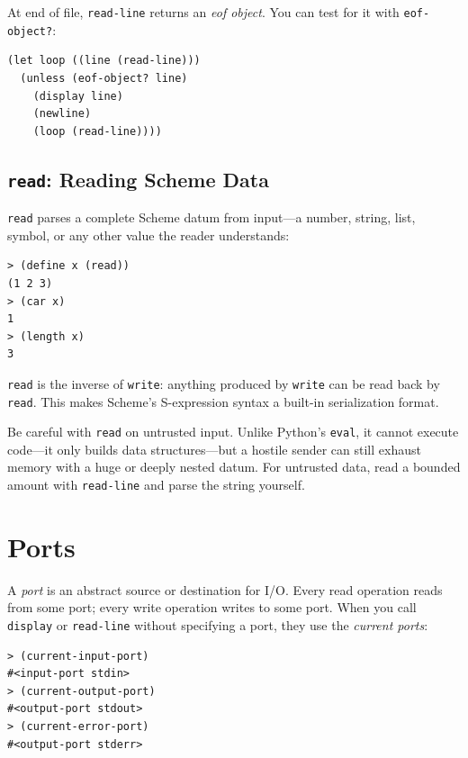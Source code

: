 At end of file, \texttt{read-line} returns an \emph{eof object}. You can test for it with \texttt{eof-object?}:

\begin{lstlisting}
(let loop ((line (read-line)))
  (unless (eof-object? line)
    (display line)
    (newline)
    (loop (read-line))))
\end{lstlisting}

\subsection{\texttt{read}: Reading Scheme Data}

\texttt{read} parses a complete Scheme datum from input---a number, string, list, symbol, or any other value the reader understands:

\begin{lstlisting}[style=repl]
> (define x (read))
(1 2 3)
> (car x)
1
> (length x)
3
\end{lstlisting}

\texttt{read} is the inverse of \texttt{write}: anything produced by \texttt{write} can be read back by \texttt{read}. This makes Scheme's S-expression syntax a built-in serialization format.

\begin{warning}[Security]
Be careful with \texttt{read} on untrusted input. Unlike Python's \texttt{eval}, it cannot execute code---it only builds data structures---but a hostile sender can still exhaust memory with a huge or deeply nested datum. For untrusted data, read a bounded amount with \texttt{read-line} and parse the string yourself.
\end{warning}

\section{Ports}

A \emph{port} is an abstract source or destination for I/O. Every read operation reads from some port; every write operation writes to some port. When you call \texttt{display} or \texttt{read-line} without specifying a port, they use the \emph{current ports}:

\begin{lstlisting}[style=repl]
> (current-input-port)
#<input-port stdin>
> (current-output-port)
#<output-port stdout>
> (current-error-port)
#<output-port stderr>
\end{lstlisting}

